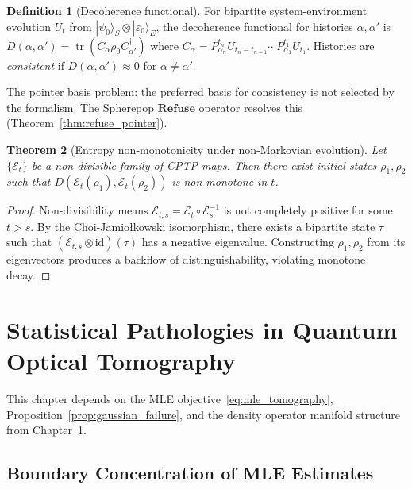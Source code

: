 \documentclass[11pt, openright, twoside]{book}
\theoremstyle{plain}
\newtheorem{theorem}{Theorem}[chapter]
\theoremstyle{definition}
\newtheorem{definition}[theorem]{Definition}
\theoremstyle{remark}
\newcommand{\Refuse}{\mathbf{Refuse}}
\begin{document}
\begin{definition}[Decoherence functional]
\label{def:decoherence_functional}
For bipartite system-environment evolution $U_t$ from $|\psi_0\rangle_S\otimes|\varepsilon_0\rangle_E$,
the decoherence functional for histories $\alpha,\alpha'$ is
$D(\alpha,\alpha') = \operatorname{tr}(C_\alpha\rho_0 C_{\alpha'}^\dagger)$
where $C_\alpha = P_{\alpha_n}^{t_n}U_{t_n-t_{n-1}}\cdots P_{\alpha_1}^{t_1}U_{t_1}$.
Histories are \emph{consistent} if $D(\alpha,\alpha')\approx 0$ for $\alpha\neq\alpha'$.
\end{definition}

The pointer basis problem: the preferred basis for consistency is not selected by the
formalism. The Spherepop $\Refuse$ operator resolves this (Theorem~\ref{thm:refuse_pointer}).

\begin{theorem}[Entropy non-monotonicity under non-Markovian evolution]
\label{thm:non_markov_entropy}
Let $\{\mathcal{E}_t\}$ be a non-divisible family of CPTP maps. Then there exist initial
states $\rho_1,\rho_2$ such that $D(\mathcal{E}_t(\rho_1),\mathcal{E}_t(\rho_2))$ is
non-monotone in $t$.
\end{theorem}

\begin{proof}
Non-divisibility means $\mathcal{E}_{t,s}=\mathcal{E}_t\circ\mathcal{E}_s^{-1}$ is not
completely positive for some $t>s$. By the Choi-Jamio\l{}kowski isomorphism, there exists
a bipartite state $\tau$ such that $(\mathcal{E}_{t,s}\otimes\mathrm{id})(\tau)$ has a
negative eigenvalue. Constructing $\rho_1,\rho_2$ from its eigenvectors produces a
backflow of distinguishability, violating monotone decay.
\end{proof}

\chapter{Statistical Pathologies in Quantum Optical Tomography}

\begin{depbox}
This chapter depends on the MLE objective~\eqref{eq:mle_tomography}, Proposition~\ref{prop:gaussian_failure},
and the density operator manifold structure from Chapter~1.
\end{depbox}

\section{Boundary Concentration of MLE Estimates}
\end{document}
